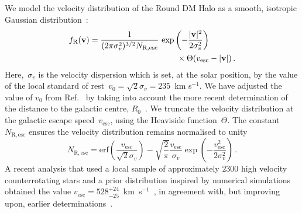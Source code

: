 \documentclass[prd,10pt,twocolumn,showpacs,nofootinbib,aps,superscriptaddress,preprintnumbers]{revtex4-1}
\newcommand{\vesc}{v_\mathrm{esc}}
\newcommand{\erf}{\mathrm{erf}}
\newcommand{\vbf}{\mathbf{v}}
\newcommand{\fR}{f_{\rm R}}
\begin{document}
  We model the velocity distribution of the Round DM Halo as a
  smooth, isotropic Gaussian distribution~\cite{Drukier:1986tm}:
  \begin{equation}\label{eq:shm}
  \begin{split}
  \fR(\vbf) = \frac{1}{(2\pi
    \sigma_v^2)^{3/2}N_\mathrm{R,esc}} \, &\exp \left( - \frac{|\vbf|^2}{2\sigma_v^2}\right) \\
    &\qquad \times \Theta (\vesc - |\vbf|)\,.
    \end{split}
   \end{equation}
  Here,~$\sigma_v$ is the velocity dispersion which is set, at the solar
  position, by the value of the local standard of rest~$v_0 = \sqrt{2}
  \sigma_v = 235$~km \!\!s$^{-1}$. We have adjusted the value of $v_0$
    from Ref.~\cite{Evans:2018bqy} by taking into account the more recent
    determination of the distance to the galactic centre, $R_0$~\cite{2019arXiv190405721A}. We truncate the velocity
  distribution at the galactic escape speed~$\vesc$, using the Heaviside
  function~$\Theta$.  The constant $N_\mathrm{R,esc}$ ensures the
  velocity distribution remains normalised to unity
  \begin{equation}\label{eq:norm}
  N_\mathrm{R,esc} = \erf \left( \frac{\vesc}{\sqrt{2}\sigma_v}\right) -
  \sqrt{\frac{2}{\pi}} \frac{\vesc}{\sigma_v} \exp \left(
  -\frac{\vesc^2}{2\sigma_v^2} \right)\, .
  \end{equation}
  A recent analysis that used a local sample of approximately $2300$
  high velocity counterrotating stars and a prior distribution inspired
  by numerical simulations obtained the value $\vesc =
  528_{-25}^{+24}$~km~s$^{-1}$~\cite{Deason19}, in agreement with, but
  improving upon, earlier determinations~\citep{Sm09,Williams:2017}.

 
\end{document}
